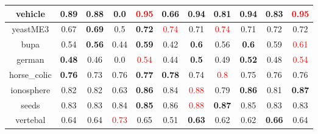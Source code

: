 \documentclass{article}%
\begin{document}
\begin{tabular}{c|cccccccccc}
\hline%
vehicle&\textbf{0.89}&0.88&0.0&\textcolor{red}{ 
0.95
}&0.66&\textbf{0.94}&0.81&\textbf{0.94}&0.83&\textcolor{red}{ 
0.95
}\\%
\hline%
yeastME3&0.67&\textbf{0.69}&0.5&\textbf{0.72}&\textcolor{red}{ 
0.74
}&0.71&\textcolor{red}{ 
0.74
}&0.71&0.72&0.72\\%
\hline%
bupa&0.54&\textbf{0.56}&0.44&\textbf{0.59}&0.42&\textbf{0.6}&0.56&\textbf{0.6}&0.59&\textcolor{red}{ 
0.61
}\\%
\hline%
german&\textbf{0.48}&0.46&0.0&\textcolor{red}{ 
0.54
}&0.44&\textbf{0.5}&0.49&\textbf{0.52}&0.48&\textcolor{red}{ 
0.54
}\\%
\hline%
horse\_colic&\textbf{0.76}&0.73&0.76&\textbf{0.77}&\textbf{0.78}&0.74&\textcolor{red}{ 
0.8
}&0.75&0.76&0.76\\%
\hline%
ionosphere&0.82&0.82&0.63&\textbf{0.86}&0.84&\textcolor{red}{ 
0.88
}&0.79&\textbf{0.86}&0.81&\textbf{0.87}\\%
\hline%
seeds&0.83&0.83&0.84&\textbf{0.85}&0.86&\textcolor{red}{ 
0.88
}&\textbf{0.87}&0.85&0.83&0.83\\%
\hline%
vertebal&0.64&0.64&\textcolor{red}{ 
0.73
}&0.65&0.51&\textbf{0.63}&0.62&0.62&\textbf{0.66}&0.64\\%
\hline%
\end{tabular}

%
\end{document}
